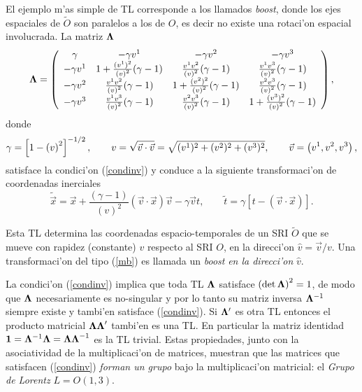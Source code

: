 El ejemplo m'as simple de TL corresponde a los llamados {\em boost},
donde los ejes espaciales de $\widetilde{O}$ son paralelos a los de $O$,
es decir no existe una rotaci'on espacial involucrada. La matriz ${\bf %
\Lambda }$ 
\begin{equation}
{\bf \Lambda }=\left( 
\begin{array}{cccc}
\gamma  & -\gamma v^1 & -\gamma v^2 & -\gamma v^3 \\ 
-\gamma v^1 & 1+\frac{(v^1)^2}{\left( v\right) ^2}(\gamma -1) & 
\frac{v^1v^2}{\left( v\right) ^2}(\gamma -1) & \frac{v^1v^3}{%
\left( v\right) ^2}(\gamma -1) \\ 
-\gamma v^2 & \frac{v^1v^2}{\left( v\right) ^2}(\gamma -1) & 1+\frac{%
(v^2)^2}{\left( v\right) ^2}(\gamma -1) & \frac{v^2v^3}{\left(
v\right) ^2}(\gamma -1) \\ 
-\gamma v^3 & \frac{v^1v^3}{\left( v\right) ^2}(\gamma -1) & \frac{%
v^2v^3}{\left( v\right) ^2}(\gamma -1) & 1+\frac{(v^3)^2}{\left(
v\right) ^2}(\gamma -1)
\end{array}
\right) ,  \label{mb}
\end{equation}
donde 
\begin{equation}
\gamma =\left[ 1-\left( v\right) ^2\right] ^{-1/2},\qquad v=\sqrt{%
\vec{v}\cdot \vec{v}}=\sqrt{%
(v^1)^2+(v^2)^2+(v^3)^2},\qquad \vec{v}=\left(
v^1,v^2,v^3\right) ,
\end{equation}
satisface la condici'on (\ref{condinv}) y conduce a la siguiente
transformaci'on de coordenadas inerciales 
\begin{equation}
\widetilde{\vec{x}}=\vec{x}+\frac{(\gamma -1)}{\left(
v\right) ^2}\left( \vec{v}\cdot \vec{x}\right) 
\vec{v}-\gamma \vec{v}t,\qquad \widetilde{t}=\gamma 
\left[ t-\left( \vec{v}\cdot \vec{x}\right) \right] .
\end{equation}

Esta TL determina las coordenadas espacio-temporales de un SRI $\widetilde{O}
$ que se mueve con rapidez (constante) $v$ respecto al SRI $O$, en la
direcci'on $\widehat{v}=\vec{v}/v$. Una transformaci'on del
tipo (\ref{mb}) es llamada un {\em boost} {\em en la direcci'on} $%
\widehat{v}$.

La condici'on (\ref{condinv}) implica que toda TL ${\bf \Lambda }$
satisface $\left( \det {\bf \Lambda }\right) ^2=1$, de modo que ${\bf %
\Lambda }$ necesariamente es no-singular y por lo tanto su matriz inversa $%
{\bf \Lambda }^{-1}$ siempre existe y tambi'en satisface (\ref{condinv}).
Si ${\bf \Lambda }^{\prime }$ es otra TL entonces el producto matricial $%
{\bf \Lambda \Lambda }^{\prime }$ tambi'en es una TL. En particular la
matriz identidad ${\bf 1}={\bf \Lambda }^{-1}{\bf \Lambda }={\bf \Lambda
\Lambda }^{-1}$ es la TL trivial. Estas propiedades, junto con la
asociatividad de la multiplicaci'on de matrices, muestran que las
matrices que satisfacen (\ref{condinv}) {\em forman un grupo} bajo la
multiplicaci'on matricial: el {\em Grupo de Lorentz }$L=O(1,3)$.

